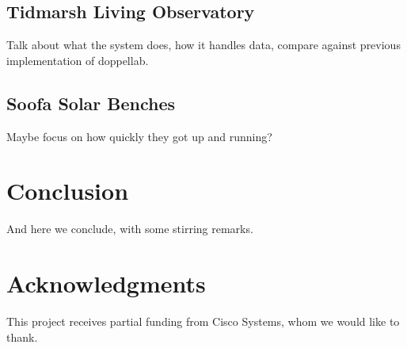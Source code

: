 \documentclass{acm_proc_article-sp}
\begin{document}
\subsection{Tidmarsh Living Observatory}

Talk about what the system does, how it handles data, compare against previous
implementation of doppellab.

\subsection{Soofa Solar Benches}

Maybe focus on how quickly they got up and running?

\section{Conclusion}
And here we conclude, with some stirring remarks.

\section{Acknowledgments}
This project receives partial funding from Cisco Systems, whom we would like to
thank.


%
%
\end{document}
